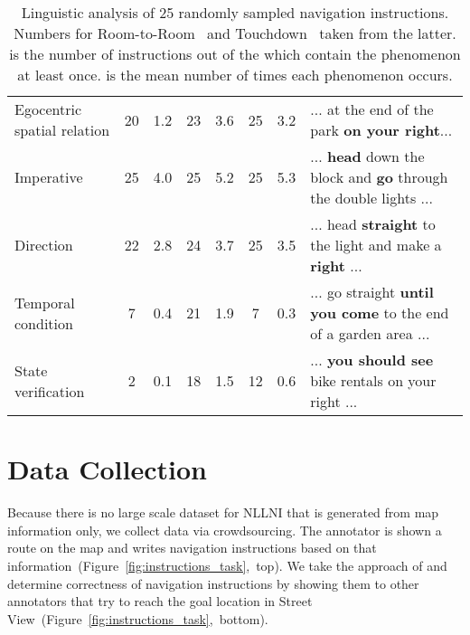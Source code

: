 \documentclass[11pt,a4paper]{article}
\begin{document}
\begin{table*}
{\begin{tabular}{|l|cc|cc|cc|l|}
Egocentric spatial relation                                & 20               & 1.2               & 23                & 3.6                 & 25               & 3.2                & ... at the end of the park \textbf{on your right}...                           \\
Imperative                                                 & 25               & 4.0               & 25                & 5.2                 & 25               & 5.3                & ... \textbf{head} down the block and \textbf{go} through the double lights ... \\
Direction                                                  & 22               & 2.8               & 24                & 3.7                 & 25               & 3.5                & ... head \textbf{straight} to the light and make a \textbf{right} ...          \\
Temporal condition                                         & 7                & 0.4               & 21                & 1.9                 & 7                & 0.3                & ... go straight \textbf{until you come} to the end of a garden area ...        \\
State verification                                         & 2                & 0.1               & 18                & 1.5                 & 12               & 0.6                & ... \textbf{you should see} bike rentals on your right ...                     \\ \hline
\end{tabular}}
\caption{Linguistic analysis of 25 randomly sampled navigation instructions. Numbers for Room-to-Room~\citep{room2room} and Touchdown~\citep{chen-etal-2019-touchdown} taken from the latter.  is the number of instructions out of the  which contain the phenomenon at least once.  is the mean number of times each phenomenon occurs.}
\label{tab:linguistics}
\end{table*} \section{Data Collection}
Because there is no large scale dataset for NLLNI that is generated from map information only, we collect data via crowdsourcing. The annotator is shown a route on the map and writes navigation instructions based on that information~(Figure~\ref{fig:instructions_task},~top). We take the approach of \citet{chen-etal-2019-touchdown} and determine correctness of navigation instructions by showing them to other annotators that try to reach the goal location in Street View~(Figure~\ref{fig:instructions_task},~bottom).
\end{document}
